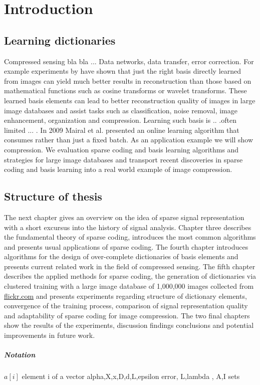 \chapter{Introduction}
\label{sec:introduction}
\section{Learning dictionaries} %
Compressed sensing bla bla ...
Data networks, data transfer, error correction. For example experiments by
\cite{} have shown that just the right basis directly learned from images can
yield much better results in reconstruction than those based on mathematical
functions such as cosine transforms or wavelet\cite{Elad2006,Mairal2010}
transforms. These learned basis elements can lead to better reconstruction
quality of images in large image databases and assist tasks such as
classification, noise removal, image enhancement, organization and compression. 
Learning such basis is .. .often limited ... . In 2009 Mairal et
al.\cite{Mairal2009} presented an online learning algorithm that consumes 
rather than just a fixed batch. As an application example we will show
compression. We evaluation sparse coding and basis learning algorithms and
strategies for large image databases and transport recent discoveries in sparse
coding and basis learning into a real world example of image compression.

\section{Structure of thesis}
The next chapter gives an overview on the idea of sparse signal
representation with a short excursus into the history of signal analysis.
Chapter  three describes the fundamental theory of sparse coding, introduces the
most common algorithms and presents usual applications of sparse coding. The
fourth chapter introduces algorithms for the design of over-complete
dictionaries of basis elements and presents current related work in the field of
compressed sensing. The fifth chapter describes the applied methods for sparse
coding, the generation of dictionaries via clustered training with a large image
database of 1,000,000 images collected from \url{flickr.com} and presents
experiments regarding structure of dictionary elements, convergence of the
training process,
comparison of signal representation quality and adaptability of sparse coding
for image compression. The two final chapters show the results of the
experiments, discussion findings conclusions and potential improvements in
future work. 

\paragraph{Notation}
$a[i]$ element i of a vector
alpha,X,x,D,d,L,epsilon error, L,lambda , A,I sets



